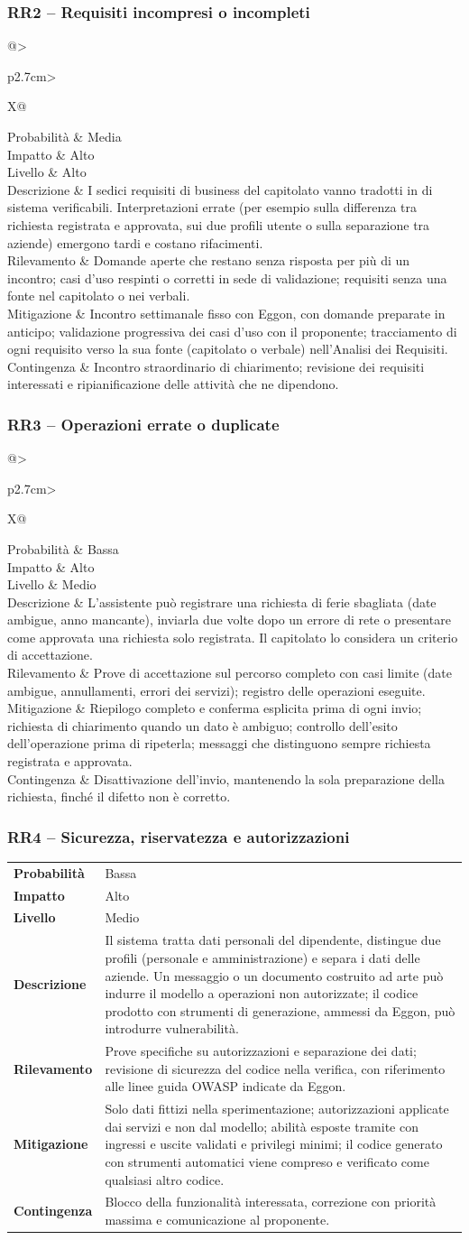 \documentclass[documento]{gpt}
\makeatletter
\newcommand{\rischio}[9]{%
  \subsubsection{#1 -- #2}\label{rischio:#1}
  \noindent
  \begin{tabularx}{\linewidth}{@{}>{\raggedright\arraybackslash\bfseries}p{2.7cm}>{\raggedright\arraybackslash}X@{}}
    \toprule
    Probabilità & #3 \\
    Impatto     & #4 \\
    Livello     & #5 \\
    \midrule
    Descrizione & #6 \\
    \addlinespace
    Rilevamento & #7 \\
    \addlinespace
    Mitigazione & #8 \\
    \addlinespace
    Contingenza & #9 \\
    \bottomrule
  \end{tabularx}
  \medskip
}
\makeatother
\begin{document}
\rischio{RR2}{Requisiti incompresi o incompleti}{Media}{Alto}{Alto}
{I sedici requisiti di business del capitolato vanno tradotti in
 \glo[Requisito]{requisiti} di sistema verificabili. Interpretazioni errate (per esempio
 sulla differenza tra richiesta registrata e approvata, sui due profili
 utente o sulla separazione tra aziende) emergono tardi e costano
 rifacimenti.}
{Domande aperte che restano senza risposta per più di un incontro;
 casi d'uso respinti o corretti in sede di validazione; requisiti senza
 una fonte nel capitolato o nei verbali.}
{Incontro settimanale fisso con Eggon, con domande preparate in anticipo;
 validazione progressiva dei casi d'uso con il proponente; tracciamento
 di ogni requisito verso la sua fonte (capitolato o verbale) nell'Analisi
 dei Requisiti.}
{Incontro straordinario di chiarimento; revisione dei requisiti
 interessati e ripianificazione delle attività che ne dipendono.}

\rischio{RR3}{Operazioni errate o duplicate}{Bassa}{Alto}{Medio}
{L'assistente può registrare una richiesta di ferie sbagliata (date
 ambigue, anno mancante), inviarla due volte dopo un errore di rete o
 presentare come approvata una richiesta solo registrata. Il capitolato
 lo considera un criterio di accettazione.}
{Prove di accettazione sul percorso completo con casi limite (date
 ambigue, annullamenti, errori dei servizi); registro delle operazioni
 eseguite.}
{Riepilogo completo e conferma esplicita prima di ogni invio; richiesta
 di chiarimento quando un dato è ambiguo; controllo dell'esito
 dell'operazione prima di ripeterla; messaggi che distinguono sempre
 richiesta registrata e approvata.}
{Disattivazione dell'invio, mantenendo la sola preparazione della
 richiesta, finché il difetto non è corretto.}

\rischio{RR4}{Sicurezza, riservatezza e autorizzazioni}{Bassa}{Alto}{Medio}
{Il sistema tratta dati personali del dipendente, distingue due profili
 (personale e amministrazione) e separa i dati delle aziende. Un messaggio
 o un documento costruito ad arte può indurre il modello a operazioni non
 autorizzate; il codice prodotto con strumenti di generazione, ammessi da
 Eggon, può introdurre vulnerabilità.}
{Prove specifiche su autorizzazioni e separazione dei dati; revisione di
 sicurezza del codice nella verifica, con riferimento alle linee guida
 OWASP indicate da Eggon.}
{Solo dati fittizi nella sperimentazione; autorizzazioni applicate dai
 servizi e non dal modello; abilità esposte tramite \glo{MCP} con ingressi e
 uscite validati e privilegi minimi; il codice generato con strumenti
 automatici viene compreso e verificato come qualsiasi altro codice.}
{Blocco della funzionalità interessata, correzione con priorità massima e
 comunicazione al proponente.}
\end{document}
